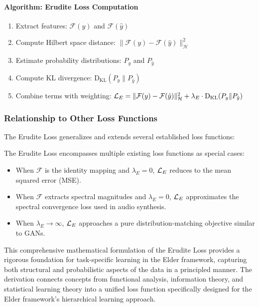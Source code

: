 \paragraph{Algorithm: Erudite Loss Computation}
\begin{enumerate}
\item Extract features: $\mathcal{F}(y)$ and $\mathcal{F}(\hat{y})$
\item Compute Hilbert space distance: $\|\mathcal{F}(y) - \mathcal{F}(\hat{y})\|_{\mathcal{H}}^2$
\item Estimate probability distributions: $P_y$ and $P_{\hat{y}}$
\item Compute KL divergence: $\mathrm{D_{KL}}(P_y \| P_{\hat{y}})$
\item Combine terms with weighting: $\mathcal{L}_E = \|\mathcal{F}(y) - \mathcal{F}(\hat{y})\|_{\mathcal{H}}^2 + \lambda_E \cdot \mathrm{D_{KL}}(P_y \| P_{\hat{y}})$
\end{enumerate}

\subsubsection{Relationship to Other Loss Functions}

The Erudite Loss generalizes and extends several established loss functions:

\begin{proposition}
The Erudite Loss encompasses multiple existing loss functions as special cases:
\begin{itemize}
\item When $\mathcal{F}$ is the identity mapping and $\lambda_E = 0$, $\mathcal{L}_E$ reduces to the mean squared error (MSE).
\item When $\mathcal{F}$ extracts spectral magnitudes and $\lambda_E = 0$, $\mathcal{L}_E$ approximates the spectral convergence loss used in audio synthesis.
\item When $\lambda_E \to \infty$, $\mathcal{L}_E$ approaches a pure distribution-matching objective similar to GANs.
\end{itemize}
\end{proposition}

This comprehensive mathematical formulation of the Erudite Loss provides a rigorous foundation for task-specific learning in the Elder framework, capturing both structural and probabilistic aspects of the data in a principled manner. The derivation connects concepts from functional analysis, information theory, and statistical learning theory into a unified loss function specifically designed for the Elder framework's hierarchical learning approach.


